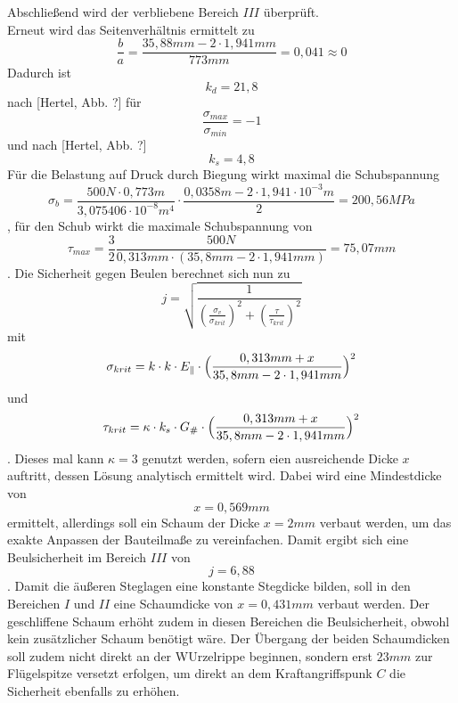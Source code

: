 \noindent Abschließend wird der verbliebene Bereich $III$ überprüft.\\
\noindent Erneut wird das Seitenverhältnis ermittelt zu 
\begin{equation}
	\frac{b}{a}=\frac{35,88mm - 2\cdot 1,941mm}{773mm}=0,041\approx 0
\end{equation}
Dadurch ist
\begin{equation}
	k_{d}=21,8
\end{equation}
nach [Hertel, Abb. ?] für 
\begin{equation}
	\frac{\sigma_{max}}{\sigma_{min}}=-1
\end{equation} 
und nach [Hertel, Abb. ?]
\begin{equation}
	k_{s} = 4,8
\end{equation}
Für die Belastung auf Druck durch Biegung wirkt maximal die Schubspannung
\begin{equation}
	\sigma_{b} = \frac{500N\cdot 0,773m}{3,075406\cdot 10^{-8}m^{4}}\cdot\frac{0,0358m - 2\cdot 1,941\cdot 10^{-3}m}{2}=200,56 MPa
\end{equation}
, für den Schub wirkt die maximale Schubspannung von
\begin{equation}
	\tau_{max}=\frac{3}{2}\frac{500N}{0,313mm\cdot(35,8mm-2\cdot 1,941mm)}=75,07mm
\end{equation}
. Die Sicherheit gegen Beulen berechnet sich nun zu 
\begin{equation}
	j=\sqrt{\frac{1}{(\frac{\sigma_{v}}{\sigma_{krit}})^{2}+(\frac{\tau}{\tau_{krit}})^{2}}}
\end{equation}
mit 
\begin{equation}
	\sigma_{krit}=k\cdot k\cdot E_{\parallel}\cdot \Bigl(\frac{0,313mm+x}{35,8mm -2\cdot 1,941mm}\Bigr)^{2}
\end{equation}
und
\begin{equation}
	\tau_{krit} = \kappa\cdot k_{s}\cdot G_{\#}\cdot\Bigl(\frac{0,313mm + x}{35,8mm -2\cdot 1,941mm}\Bigr)^{2}
\end{equation}
. Dieses mal kann $\kappa=3$ genutzt werden, sofern eien ausreichende Dicke $x$ auftritt, dessen Lösung analytisch ermittelt wird. Dabei wird eine Mindestdicke von 
\begin{equation}
	x=0,569mm
\end{equation}
ermittelt, allerdings soll ein Schaum der Dicke $x=2mm$ verbaut werden, um das exakte Anpassen der Bauteilmaße zu vereinfachen. Damit ergibt sich eine Beulsicherheit im Bereich $III$ von
\begin{equation}
	j=6,88
\end{equation}
. Damit die äußeren Steglagen eine konstante Stegdicke bilden, soll in den Bereichen $I$ und $II$ eine Schaumdicke von $x=0,431mm$ verbaut werden. Der geschliffene Schaum erhöht zudem in diesen Bereichen die Beulsicherheit, obwohl kein zusätzlicher Schaum benötigt wäre. Der Übergang der beiden Schaumdicken soll zudem nicht direkt an der WUrzelrippe beginnen, sondern erst $23mm$ zur Flügelspitze versetzt erfolgen, um direkt an dem Kraftangriffspunk $C$ die Sicherheit ebenfalls zu erhöhen.
